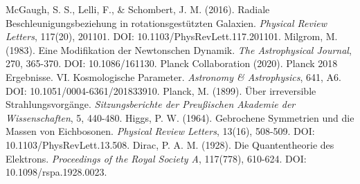 \documentclass[12pt,a4paper]{article}
\begin{document}
\begin{thebibliography}{99}
		 McGaugh, S. S., Lelli, F., \& Schombert, J. M. (2016). Radiale Beschleunigungsbeziehung in rotationsgestützten Galaxien. \textit{Physical Review Letters}, 117(20), 201101. DOI: 10.1103/PhysRevLett.117.201101.
		 Milgrom, M. (1983). Eine Modifikation der Newtonschen Dynamik. \textit{The Astrophysical Journal}, 270, 365-370. DOI: 10.1086/161130.
		 Planck Collaboration (2020). Planck 2018 Ergebnisse. VI. Kosmologische Parameter. \textit{Astronomy \& Astrophysics}, 641, A6. DOI: 10.1051/0004-6361/201833910.
		 Planck, M. (1899). Über irreversible Strahlungsvorgänge. \textit{Sitzungsberichte der Preußischen Akademie der Wissenschaften}, 5, 440-480.
		 Higgs, P. W. (1964). Gebrochene Symmetrien und die Massen von Eichbosonen. \textit{Physical Review Letters}, 13(16), 508-509. DOI: 10.1103/PhysRevLett.13.508.
		 Dirac, P. A. M. (1928). Die Quantentheorie des Elektrons. \textit{Proceedings of the Royal Society A}, 117(778), 610-624. DOI: 10.1098/rspa.1928.0023.
	\end{thebibliography}
	
\end{document}
